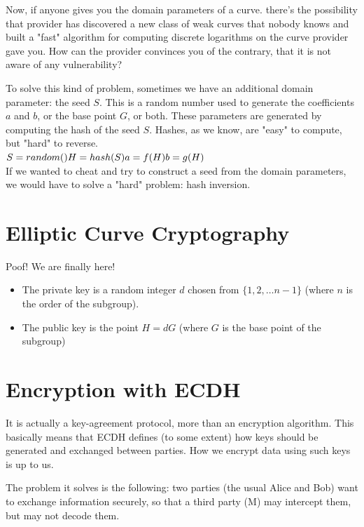 \documentclass[12pt,letterpaper]{article}
\begin{document}
Now, if anyone gives you the domain parameters of a curve. there's the possibility that provider has discovered a new class of weak curves that nobody knows and built a "fast" algorithm for computing discrete logarithms on the curve provider gave you. How can the provider convinces you of the contrary, that it is not aware of any vulnerability?

To solve this kind of problem, sometimes we have an additional domain parameter: the seed $S$. This is a random number used to generate the coefficients $a$ and $b$, or the base point $G$, or both. These parameters are generated by computing the hash of the seed $S$. Hashes, as we know, are "easy" to compute, but "hard" to reverse.\\
$S= random()\\
 H = hash(S)\\
 a = f(H)\\
 b = g(H)$\\
 If we wanted to cheat and try to construct a seed from the domain parameters, we would have to solve a "hard" problem: hash inversion.
 
 \section{Elliptic Curve Cryptography}
Poof! We are finally here!
\begin{itemize}
    \item The private key is a random integer $d$ chosen from $\{1,2,\dots n-1\}$  (where $n$ is the order of the subgroup).
    \item The public key is the point $H=dG$ (where $G$ is the base point of the subgroup)
\end{itemize}
\section{Encryption with ECDH}
It is actually a key-agreement protocol, more than an encryption algorithm. This basically means that ECDH defines (to some extent) how keys should be generated and exchanged between parties. How we encrypt data using such keys is up to us.

The problem it solves is the following: two parties (the usual Alice and Bob) want to exchange information securely, so that a third party (M) may intercept them, but may not decode them. 
\end{document}
